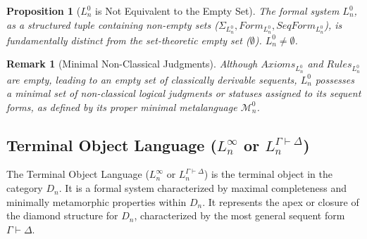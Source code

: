 \documentclass{article}
\newtheorem{proposition}{Proposition}[section] %
\newtheorem{remark}{Remark}[section] %
\begin{document}
																															\begin{proposition}[$L^0_n$ is Not Equivalent to the Empty Set]
																																The formal system $L^0_n$, as a structured tuple containing non-empty sets ($\Sigma_{L^0_n}, Form_{L^0_n}, SeqForm_{L^0_n}$), is fundamentally distinct from the set-theoretic empty set ($\emptyset$). $L^0_n \neq \emptyset$.
																															\end{proposition}
																															
																															\begin{remark}[Minimal Non-Classical Judgments]
																																Although $Axioms_{L^0_n}$ and $Rules_{L^0_n}$ are empty, leading to an empty set of classically derivable sequents, $L^0_n$ possesses a minimal set of non-classical logical judgments or statuses assigned to its sequent forms, as defined by its proper minimal metalanguage $\mathcal{M}^0_n$.
																																\end{remark}
																																	
																																	\subsection{Terminal Object Language ($L^\infty_n$ or $L^{\Gamma\vdash\Delta}_n$)}
																																	
																																	The Terminal Object Language ($L^\infty_n$ or $L^{\Gamma\vdash\Delta}_n$) is the terminal object in the category $D_n$. It is a formal system characterized by maximal completeness and minimally metamorphic properties within $D_n$. It represents the apex or closure of the diamond structure for $D_n$, characterized by the most general sequent form $\Gamma \vdash \Delta$.
																																	
\end{document}
